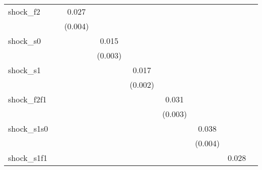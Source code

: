 {\begin{tabular}{l*{8}{c}}
\addlinespace
shock\_f2    &                     &       0.027\sym{***}&                     &                     &                     &                     &                     &                     \\
            &                     &     (0.004)         &                     &                     &                     &                     &                     &                     \\
\addlinespace
shock\_s0    &                     &                     &       0.015\sym{***}&                     &                     &                     &                     &                     \\
            &                     &                     &     (0.003)         &                     &                     &                     &                     &                     \\
\addlinespace
shock\_s1    &                     &                     &                     &       0.017\sym{***}&                     &                     &                     &                     \\
            &                     &                     &                     &     (0.002)         &                     &                     &                     &                     \\
\addlinespace
shock\_f2f1  &                     &                     &                     &                     &       0.031\sym{***}&                     &                     &                     \\
            &                     &                     &                     &                     &     (0.003)         &                     &                     &                     \\
\addlinespace
shock\_s1s0  &                     &                     &                     &                     &                     &       0.038\sym{***}&                     &                     \\
            &                     &                     &                     &                     &                     &     (0.004)         &                     &                     \\
\addlinespace
shock\_s1f1  &                     &                     &                     &                     &                     &                     &       0.028\sym{***}&                     \\

\end{tabular}}
